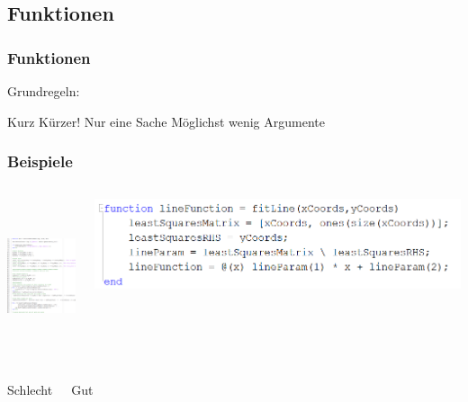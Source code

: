\documentclass{beamer}
\begin{document}
\subsection{Funktionen}
\begin{frame}
    \frametitle{Funktionen}
    Grundregeln:

    \begin{outline}
        \pause
        \1 Kurz
        \pause
        \1 Kürzer!
        \pause
        \1 Nur eine Sache
        \pause
        \1 Möglichst wenig Argumente
    \end{outline}
\end{frame}
\begin{frame}
    \frametitle{Beispiele}
    \begin{columns}[t]
        \begin{center}
            \includegraphics[height=4.5cm]{FunktionSchlecht.png}
        \end{center}
        \begin{center}
            \includegraphics[width=\linewidth]{FunktionGut.png}
        \end{center}
    \end{columns}
    \begin{columns}[t]
        \begin{center}
            \huge \color{red} Schlecht
        \end{center}
        \begin{center}
            \huge \color{green} Gut
        \end{center}
    \end{columns}
\end{frame}
\end{document}
